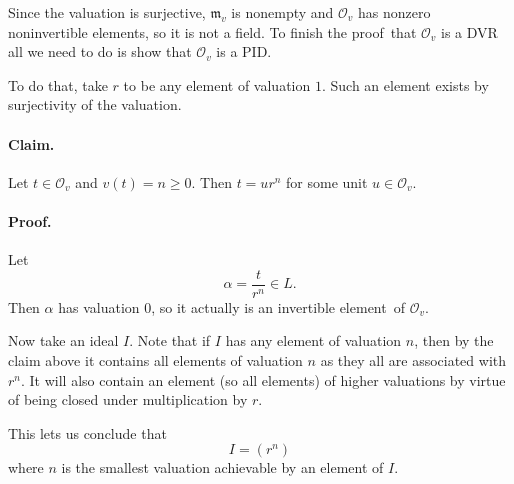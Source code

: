Since the valuation is surjective, \( \mathfrak{m}_v \) is nonempty and \( \mathcal{O}_v \) has
nonzero noninvertible elements, so it is not a field. To finish the proof~that
\( \mathcal{O}_v \) is a DVR all we need to do is show that \( \mathcal{O}_v \) is a PID.

To do that, take \( r \) to be any element of valuation \( 1 \). Such an element
exists by surjectivity of the valuation.

\paragraph{Claim.} Let \( t \in \mathcal{O}_v \) and \( v(t) = n \geqslant 0 \).
Then \( t = ur^n \) for some unit \( u \in \mathcal{O}_v \).

\paragraph{Proof.} Let
\[ 
    \alpha = \frac{t}{r^n} \in L. 
\]
Then \( \alpha \) has valuation \( 0 \), so it actually is an invertible
element~of \( \mathcal{O}_v \).


Now take an ideal \( I \). Note that if \( I \) has any element of valuation \( n \),
then by the claim above it contains all elements of valuation \( n \) as they all are
associated with \( r^n \). It will also contain an element (so all elements) of higher
valuations by virtue of being closed under multiplication by \( r \).

This lets us conclude that 
\[ 
    I = (r^n) 
\]
where \( n \) is the smallest valuation achievable by an element of \( I \).

